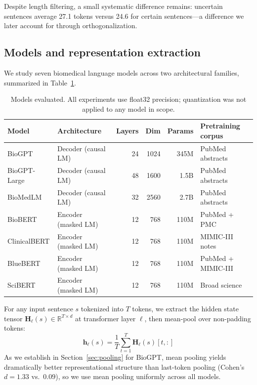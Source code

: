 \documentclass[11pt,a4paper]{article}
\begin{document}
Despite length filtering, a small systematic difference remains: uncertain
sentences average 27.1 tokens versus 24.6 for certain sentences---a
difference we later account for through orthogonalization.

\subsection{Models and representation extraction}

We study seven biomedical language models across two architectural
families, summarized in Table~\ref{tab:models}.

\begin{table}[ht]
\centering
\caption{Models evaluated. All experiments use float32 precision;
  quantization was not applied to any model in scope.}
\label{tab:models}
\begin{tabular}{llrrrl}
\toprule
\textbf{Model} & \textbf{Architecture} & \textbf{Layers} & \textbf{Dim} & \textbf{Params} & \textbf{Pretraining corpus} \\
\midrule
BioGPT       & Decoder (causal LM) & 24 & 1024 & 345M  & PubMed abstracts \\
BioGPT-Large & Decoder (causal LM) & 48 & 1600 & 1.5B  & PubMed abstracts \\
BioMedLM     & Decoder (causal LM) & 32 & 2560 & 2.7B  & PubMed abstracts \\
\midrule
BioBERT      & Encoder (masked LM) & 12 & 768  & 110M  & PubMed + PMC \\
ClinicalBERT & Encoder (masked LM) & 12 & 768  & 110M  & MIMIC-III notes \\
BlueBERT     & Encoder (masked LM) & 12 & 768  & 110M  & PubMed + MIMIC-III \\
SciBERT      & Encoder (masked LM) & 12 & 768  & 110M  & Broad science \\
\bottomrule
\end{tabular}
\end{table}

For any input sentence $s$ tokenized into $T$ tokens, we extract the
hidden state tensor $\mathbf{H}_\ell(s) \in \mathbb{R}^{T \times d}$ at
transformer layer $\ell$, then mean-pool over non-padding tokens:
\begin{equation}
\mathbf{h}_\ell(s) = \frac{1}{T}\sum_{t=1}^{T} \mathbf{H}_\ell(s)[t,:]
\label{eq:meanpool}
\end{equation}
As we establish in Section~\ref{sec:pooling} for BioGPT, mean pooling
yields dramatically better representational structure than last-token
pooling (Cohen's $d = 1.33$ vs.\ $0.09$), so we use mean pooling
uniformly across all models.
\end{document}
